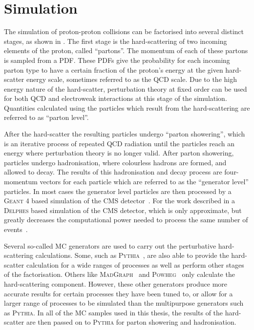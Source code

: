 \section{Simulation}
\label{sec:sim}
The simulation of \LHC proton-proton collisions can be factorised into several distinct stages, as shown in . The first stage is the hard-scattering of two incoming elements of the proton, called ``partons''. The momentum of each of these partons is sampled from a \ac{PDF}. These \ac{PDF}s give the probability for each incoming parton type to have a certain fraction of the proton's energy at the given hard-scatter energy scale, sometimes referred to as the \ac{QCD} scale. Due to the high energy nature of the hard-scatter, perturbation theory at fixed order can be used for both \ac{QCD} and electroweak interactions at this stage of the simulation. Quantities calculated using the particles which result from the hard-scattering are referred to as ``parton level''.

After the hard-scatter the resulting particles undergo ``parton showering'', which is an iterative process of repeated \ac{QCD} radiation until the particles reach an energy where perturbation theory is no longer valid. After parton showering, particles undergo hadronisation, where colourless hadrons are formed, and allowed to decay. The results of this hadronisation and decay process are four-momentum vectors for each particle which are referred to as the ``generator level'' particles. In most cases the generator level particles are then processed by a \textsc{Geant} 4 based simulation of the CMS detector~\cite{Agostinelli2003250}. For the work described in  a \textsc{Delphes} based simulation of the CMS detector, which is only approximate, but greatly decreases the computational power needed to process the same number of events~\cite{Favereau2014}.

Several so-called \ac{MC} generators are used to carry out the perturbative hard-scattering calculations. Some, such as \textsc{Pythia}~\cite{Sjöstrand2008852}, are also able to provide the hard-scatter calculation for a wide ranges of processes as well as perform other stages of the factorisation. Others like \textsc{MadGraph}~\cite{Alwall2014} and \textsc{Powheg}~\cite{Nason:2004rx,Frixione:2007vw,Alioli:2010xd} only calculate the hard-scattering component. However, these other generators produce more accurate results for certain processes they have been tuned to, or allow for a larger range of processes to be simulated than the multipurpose generators such as \textsc{Pythia}. In all of the \ac{MC} samples used in this thesis, the results of the hard-scatter are then passed on to \textsc{Pythia} for parton showering and hadronisation.

